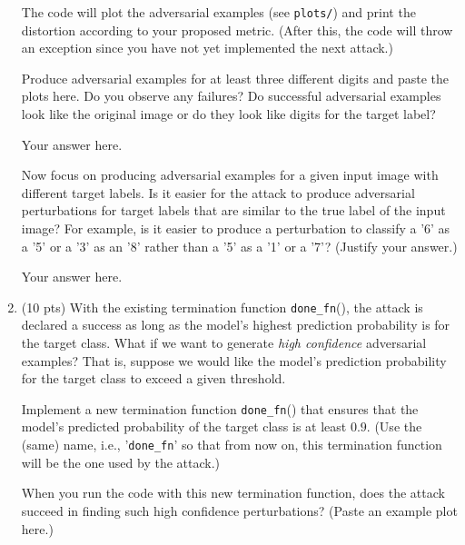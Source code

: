 \begin{enumerate}
	The code will plot the adversarial examples (see \texttt{plots/}) and print the distortion according to your proposed metric. (After this, the code will throw an exception since you have not yet implemented the next attack.)
	
	Produce adversarial examples for at least three different digits and paste the plots here. Do you observe any failures? Do successful adversarial examples look like the original image or do they look like digits for the target label?
	
	\begin{answer}
	
		Your answer here.
		
	\end{answer}
	
	\medskip \noindent Now focus on producing adversarial examples for a given input image with different target labels. Is it easier for the attack to produce adversarial perturbations for target labels that are similar to the true label of the input image? For example, is it easier to produce a perturbation to classify a '6' as a '5' or a '3' as an '8' rather than a '5' as a '1' or a '7'? (Justify your answer.)
	
	\begin{answer}
	
		Your answer here.
		
	\end{answer}
	
	\item (10 pts) With the existing termination function \texttt{done\_fn}(), the attack is declared a success as long as the model's highest prediction probability is for the target class. What if we want to generate {\em high confidence} adversarial examples? That is, suppose we would like the model's prediction probability for the target class to exceed a given threshold.
	
	Implement a new termination function \texttt{done\_fn}() that ensures that the model's predicted probability of the target class is at least $0.9$. (Use the (same) name, i.e., '\texttt{done\_fn}' so that from now on, this termination function will be the one used by the attack.)
	
	 When you run the code with this new termination function, does the attack succeed in finding such high confidence perturbations? (Paste an example plot here.)
	
	\begin{answer}
	

\end{answer}
\end{enumerate}
